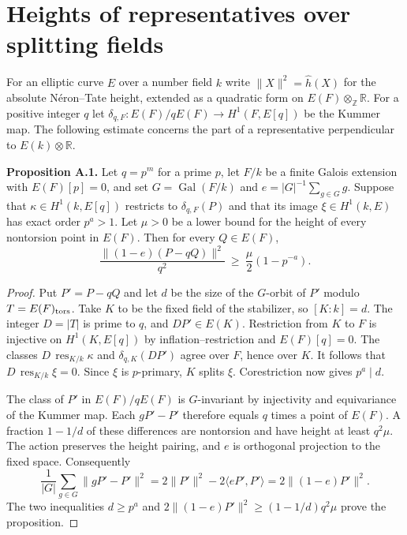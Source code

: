\documentclass[11pt]{article}
\begin{document}
\appendix
\section{Heights of representatives over splitting fields}
\label{sec:heights}

For an elliptic curve $E$ over a number field $k$ write
$\|X\|^2=\widehat h(X)$ for the absolute N\'eron--Tate height,
extended as a quadratic form on $E(F)\otimes_{\mathbb Z}\mathbb R$.
For a positive integer $q$ let $\delta_{q,F}:E(F)/qE(F)\to
H^1(F,E[q])$ be the Kummer map. The following estimate concerns the
part of a representative perpendicular to $E(k)\otimes\mathbb R$.

\medskip
\noindent\textbf{Proposition A.1.}
Let $q=p^m$ for a prime $p$, let $F/k$ be a finite Galois extension
with $E(F)[p]=0$, and set $G=\operatorname{Gal}(F/k)$ and
$e=|G|^{-1}\sum_{g\in G}g$. Suppose that $\kappa\in H^1(k,E[q])$
restricts to $\delta_{q,F}(P)$ and that its image $\xi\in H^1(k,E)$
has exact order $p^a>1$. Let $\mu>0$ be a lower bound for the height
of every nontorsion point in $E(F)$. Then for every $Q\in E(F)$,
\begin{equation}\label{eq:transverse-bound}
 \frac{\|(1-e)(P-qQ)\|^2}{q^2}
 \ \ge\ \frac{\mu}{2}(1-p^{-a}).
\end{equation}

\begin{proof}
Put $P'=P-qQ$ and let $d$ be the size of the $G$-orbit of $P'$
modulo $T=E(F)_{\rm tors}$. Take $K$ to be the fixed field of the
stabilizer, so $[K:k]=d$. The integer $D=|T|$ is prime to $q$,
and $DP'\in E(K)$. Restriction from $K$ to $F$ is injective on
$H^1(K,E[q])$ by inflation--restriction and $E(F)[q]=0$. The classes
$D\,\operatorname{res}_{K/k}\kappa$ and $\delta_{q,K}(DP')$ agree
over $F$, hence over $K$. It follows that $D\,\operatorname{res}_{K/k}
\xi=0$. Since $\xi$ is $p$-primary, $K$ splits $\xi$.
Corestriction now gives $p^a\mid d$.

The class of $P'$ in $E(F)/qE(F)$ is $G$-invariant by injectivity
and equivariance of the Kummer map. Each $gP'-P'$ therefore equals
$q$ times a point of $E(F)$. A fraction $1-1/d$ of these differences
are nontorsion and have height at least $q^2\mu$. The action preserves
the height pairing, and $e$ is orthogonal projection to the fixed
space. Consequently
\[
 \frac1{|G|}\sum_{g\in G}\|gP'-P'\|^2
 =2\|P'\|^2-2\langle eP',P'\rangle
 =2\|(1-e)P'\|^2 .
\]
The two inequalities $d\ge p^a$ and
$2\|(1-e)P'\|^2\ge(1-1/d)q^2\mu$ prove the proposition.
\end{proof}
\end{document}
